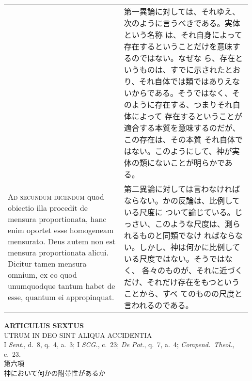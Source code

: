 \documentclass[10pt]{jsarticle}
\begin{document}
\begin{longtable}{p{21em}p{21em}}
&

第一異論に対しては、それゆえ、次のように言うべきである。実体という名称
は、それ自身によって存在するということだけを意味するのではない。なぜな
ら、存在というものは、すでに示されたとおり、それ自体では類ではありえな
いからである。そうではなく、そのように存在する、つまりそれ自体によって
存在するということが適合する本質を意味するのだが、この存在は、その本質
それ自体ではない。このようにして、神が実体の類にないことが明らかである。

\\

{\scshape Ad secundum dicendum} quod obiectio illa procedit de mensura
proportionata, hanc enim oportet esse homogeneam mensurato. Deus autem
non est mensura proportionata alicui. Dicitur tamen mensura omnium, ex
eo quod unumquodque tantum habet de esse, quantum ei appropinquat.

&

第二異論に対しては言わなければならない。かの反論は、比例している尺度に
ついて論じている。じっさい、このような尺度は、測られるものと同類でなけ
ればならない。しかし、神は何かに比例している尺度ではない。そうではなく、
各々のものが、それに近づくだけ、それだけ存在をもつということから、すべ
てのものの尺度と言われるのである。


\end{longtable}



\newpage
{}


\begin{center}
 {\Large {\bf ARTICULUS SEXTUS}}\\
 {\large UTRUM IN DEO SINT ALIQUA ACCIDENTIA}\\
 {\footnotesize I {\itshape Sent.}, d.~8, q.~4, a.~3; I {\itshape SCG.},
 c.~23; {\itshape De Pot.}, q.~7, a.~4; {\itshape Compend.~Theol.},
 c.~23.}\\
 {\Large 第六項\\神において何かの附帯性があるか}
\end{center}
\end{document}
